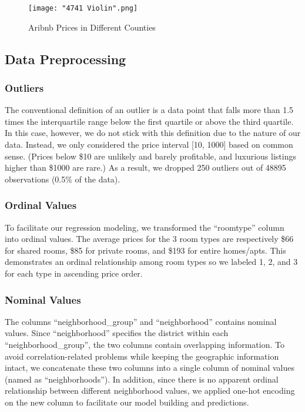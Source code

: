 \documentclass[twocolumn]{article}
\begin{document}
\begin{figure}[h]
    \centering
    \texttt{[image: "4741 Violin".png]}
    \caption{Aribnb Prices in Different Counties}
\end{figure}


\subsection{Data Preprocessing}
\subsubsection{Outliers}
The conventional definition of an outlier is a data point that falls more than 1.5 times the interquartile range below the first quartile or above the third quartile. In this case, however, we do not stick with this definition due to the nature of our data. Instead, we only considered the price interval [10, 1000] based on common sense. (Prices below \$10 are unlikely and barely profitable, and luxurious listings higher than \$1000 are rare.) As a result, we dropped 250 outliers out of 48895 observations (0.5\% of the data).

\subsubsection{Ordinal Values}
To facilitate our regression modeling, we transformed the “room\textunderscore type” column into ordinal values. The average prices for the 3 room types are respectively \$66 for shared rooms, \$85 for private rooms, and \$193 for entire homes/apts. This demonstrates an ordinal relationship among room types so we labeled 1, 2, and 3 for each type in ascending price order.

\subsubsection{Nominal Values}
The columns “neighborhood\_group” and “neighborhood” contains nominal values. Since “neighborhood” specifies the district within each “neighborhood\_group”, the two columns contain overlapping information. To avoid correlation-related problems while keeping the geographic information intact, we concatenate these two columns into a single column of nominal values (named as “neighborhoods”). In addition, since there is no apparent ordinal relationship between different neighborhood values, we applied one-hot encoding on the new column to facilitate our model building and predictions.
\end{document}
